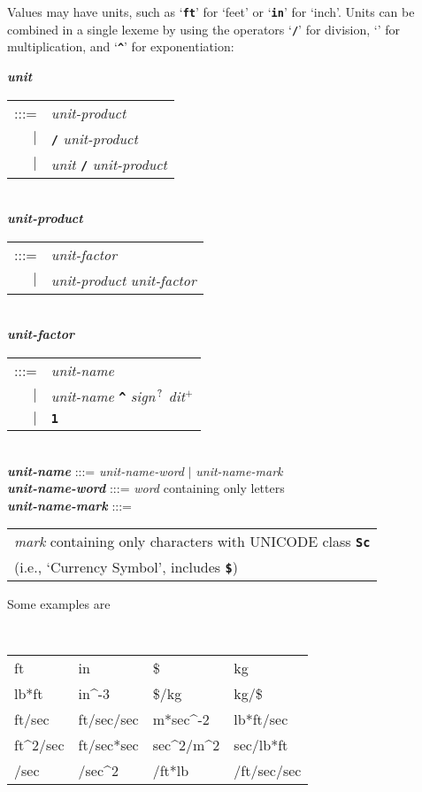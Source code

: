 \documentclass[12pt]{article}
\newcommand{\TT}[1]{{\tt \bfseries #1}}
\newcommand{\ttkey}[1]{{\tt \bfseries #1}}
\newcommand{\emkey}[1]{{\em \bfseries #1}}
\newcommand{\PLUS}[1][]{{$^{+#1}$}}
\newcommand{\QMARK}{{$^{\,\mbox{\footnotesize ?}}$}}
\newcommand{\CIRCUM}{\textasciicircum}
\newenvironment{indpar}[1][0.3in]%
	{\begin{list}{}%
		     {\setlength{\itemsep}{0in}%
		      \setlength{\topsep}{0in}%
		      \setlength{\parsep}{1ex}%
		      \setlength{\labelwidth}{#1}%
		      \setlength{\leftmargin}{#1}%
		      \addtolength{\leftmargin}{\labelsep}}%
	 \item}%
	{\end{list}}
\begin{document}
Values may have units, such as `\TT{ft}' for `feet' or
`\TT{in}' for `inch'.
Units can be combined in
a single lexeme by using the operators
`\TT{/}' for division,
`\TT{*}' for multiplication,
and `\TT{\CIRCUM}' for exponentiation:
\begin{indpar}
\emkey{unit}
    \begin{tabular}[t]{rl}
    :::= & {\em unit-product} \\
     $|$ & \TT{/} {\em unit-product} \\
     $|$ & {\em unit} \TT{/} {\em unit-product} \\
    \end{tabular}
\\
\emkey{unit-product}
    \begin{tabular}[t]{rl}
    :::= & {\em unit-factor} \\
     $|$ & {\em unit-product} \TT{*} {\em unit-factor} \\
    \end{tabular}
\\
\emkey{unit-factor}
    \begin{tabular}[t]{rl}
    :::= & {\em unit-name} \\
     $|$ & {\em unit-name} \TT{\CIRCUM}
           {\em sign}\QMARK{} {\em dit}\PLUS{}  \\
     $|$ & \TT{1} \\
    \end{tabular}
\\
\emkey{unit-name} :::= {\em unit-name-word} $|$ {\em unit-name-mark }
\\
\emkey{unit-name-word} :::= {\em word} containing only letters
\\
\emkey{unit-name-mark} :::=
    \begin{tabular}[t]{@{}l}
    {\em mark} containing only characters with UNICODE class \ttkey{Sc} \\
    (i.e., `Currency Symbol', includes \TT{\$})
    \end{tabular}
		         
\end{indpar}

Some examples are
\begin{indpar}[0.1in]
\tt
\begin{tabular}{l@{~~~}l@{~~~}l@{~~~}l}
ft		& in	& \$	& kg \\
lb*ft		& in\CIRCUM-3    & \$/kg & kg/\$ \\
ft/sec		& ft/sec/sec	& m*sec\CIRCUM-2 & lb*ft/sec \\
ft\CIRCUM 2/sec
		& ft/sec*sec	& sec\CIRCUM 2/m\CIRCUM 2
				& sec/lb*ft \\
/sec		& /sec\CIRCUM 2	& /ft*lb  & /ft/sec/sec \\
\end{tabular}
\end{indpar}
\end{document}

